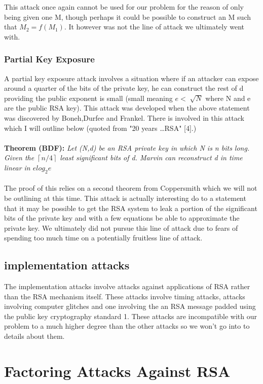 \documentclass[12pt]{article} %
\begin{document}
		This attack once again cannot be used for our problem for the reason of only being given one M, though perhaps it could be possible to construct an M such that $ M_2 = f(M_1) $. It however was not the line of attack we ultimately went with.

\subsubsection{Partial Key Exposure}
A partial key exposure attack involves a situation where if an attacker can expose around a quarter of the bits of the private key, he can construct the rest of d providing the public exponent is small (small meaning $e <\sqrt[]{N}$ where N and e are the public RSA key). This attack was developed when the above statement was discovered by Boneh,Durfee and Frankel. There is involved in this attack which I will outline below (quoted from "20 years \dots RSA" [4].)
\\\\
\textbf{Theorem (BDF): }\textit{Let (N,d) be an RSA private key in which N is n bits long. Given the $\left\lceil n/4 \right\rceil$ least significant bits of d. Marvin can reconstruct d in time linear in $elog_2e$}
\\\\
The proof of this relies on a second theorem from Coppersmith which we will not be outlining at this time. This attack is actually interesting do to a statement that it may be possible to get the RSA system to leak a portion of the significant bits of the private key and with a few equations be able to approximate the private key. We ultimately did not pursue this line of attack due to fears of spending too much time on a potentially fruitless line of attack. 


	

\subsection{implementation attacks}
The implementation attacks involve attacks against applications of RSA rather than the RSA mechanism itself. These
attacks involve timing attacks, attacks involving computer glitches and one involving the an RSA message padded using
the public key cryptography standard 1. These attacks are incompatible with our problem to a much higher degree than
the other attacks so we won't go into to details about them.
\section{Factoring Attacks Against RSA}
\end{document}
